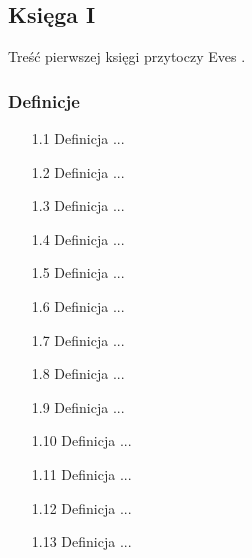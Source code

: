 \subsection{Księga I}	
Treść pierwszej księgi przytoczy Eves \cite[s. 375-379]{eves1_1972}.

\subsubsection{Definicje}	
\begin{enumerate}	
    \item [1.1] Definicja ... %
    \item [1.2] Definicja ... %
    \item [1.3] Definicja ... %
    \item [1.4] Definicja ... %
    \item [1.5] Definicja ... %
    \item [1.6] Definicja ... %
    \item [1.7] Definicja ... %
    \item [1.8] Definicja ... %
    \item [1.9] Definicja ... %
    \item [1.10] Definicja ... %
    \item [1.11] Definicja ... %
    \item [1.12] Definicja ... %
    \item [1.13] Definicja ... %

\end{enumerate}
